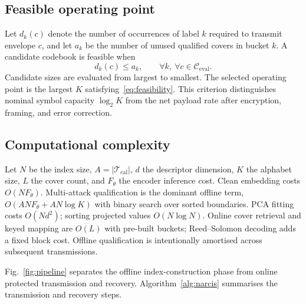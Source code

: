 ﻿\documentclass[10pt,journal]{IEEEtran}
\begin{document}
\subsection{Feasible operating point}

Let $d_k(c)$ denote the number of occurrences of label $k$ required
to transmit envelope $c$, and let $a_k$ be the number of unused
qualified covers in bucket $k$. A candidate codebook is feasible when
\begin{equation}
d_k(c)\leq a_k,\qquad
\forall k,\ \forall c\in\mathcal{C}_{\mathrm{eval}}.
\label{eq:feasibility}
\end{equation}
Candidate sizes are evaluated from largest to smallest. The selected
operating point is the largest $K$ satisfying~\eqref{eq:feasibility}.
This criterion distinguishes nominal symbol capacity $\log_2 K$ from
the net payload rate after encryption, framing, and error correction.

\subsection{Computational complexity}

Let $N$ be the index size, $A{=}|\mathcal{T}_{\mathrm{cal}}|$, $d$
the descriptor dimension, $K$ the alphabet size, $L$ the cover count,
and $F_\theta$ the encoder inference cost. Clean embedding costs
$O(NF_\theta)$. Multi-attack qualification is the dominant offline
term, $O(ANF_\theta{+}AN\log K)$ with binary search over sorted
boundaries. PCA fitting costs $O(Nd^2)$; sorting projected values
$O(N\log N)$. Online cover retrieval and keyed mapping are $O(L)$
with pre-built buckets; Reed--Solomon decoding adds a fixed block cost.
Offline qualification is intentionally amortised across subsequent
transmissions.

Fig.~\ref{fig:pipeline} separates the offline index-construction phase
from online protected transmission and recovery. Algorithm~\ref{alg:narcis}
summarises the transmission and recovery steps.
\end{document}
